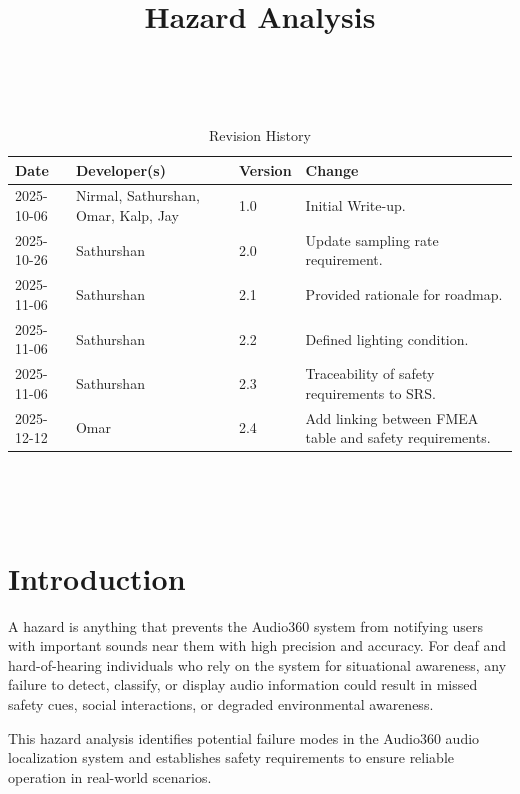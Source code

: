 \documentclass{article}
\title{Hazard Analysis\\\progname}
\author{\authname}
\date{}
\begin{document}
\maketitle
\thispagestyle{empty}

~\newpage


\begin{table}[hp]
\caption{Revision History} \label{TblRevisionHistory}
\begin{tabularx}{\textwidth}{lllX}
\toprule
\textbf{Date} & \textbf{Developer(s)} & \textbf{Version} & \textbf{Change}\\
\midrule
2025-10-06 &  Nirmal, Sathurshan, Omar, Kalp, Jay & 1.0 & Initial Write-up. \\
2025-10-26 & Sathurshan & 2.0 & Update sampling rate requirement. \\
2025-11-06 & Sathurshan & 2.1 & Provided rationale for roadmap. \\
2025-11-06 & Sathurshan & 2.2 & Defined lighting condition. \\
2025-11-06 & Sathurshan & 2.3 & Traceability of safety requirements to SRS. \\
2025-12-12 & Omar & 2.4 & Add linking between FMEA table and safety
    requirements. \\
\bottomrule
\end{tabularx}
\end{table}

~\newpage

\tableofcontents

~\newpage


\section{Introduction}

A hazard is anything that prevents the Audio360 system from notifying users with
important sounds near them with high precision and accuracy. For deaf and
hard-of-hearing individuals who rely on the system for situational awareness,
any failure to detect, classify, or display audio information could result in
missed safety cues, social interactions, or degraded environmental awareness.

This hazard analysis identifies potential failure modes in the Audio360 audio
localization system and establishes safety requirements to ensure reliable
operation in real-world scenarios.
\end{document}
